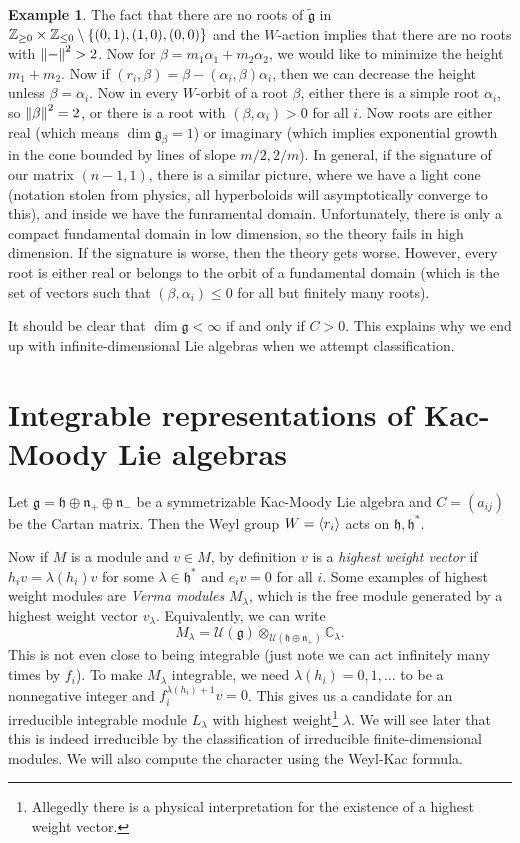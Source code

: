 \documentclass[leqno, openany]{memoir}
\theoremstyle{definition}
\newtheorem{exm}[thm]{Example}
\theoremstyle{remark}
\theoremstyle{plain}
\theoremstyle{definition}
\theoremstyle{remark}
\newcommand{\C}{\mathbb{C}}
\newcommand{\Z}{\mathbb{Z}}
\newcommand{\mc}[1]{\mathcal{#1}}
\newcommand{\mf}[1]{\mathfrak{#1}}
\newcommand{\wtl}[1]{\widetilde{#1}}
\begin{document}
\begin{exm}
    The fact that there are no roots of $\wtl{\mf{g}}$ in $\Z_{\geq 0} \times \Z_{\leq 0} \setminus \qty{(0,1), (1,0), (0,0)}$ and the $W$-action implies that there are no roots with $\norm{-}^2 > 2$. Now for $\beta = m_1 \alpha_1 + m_2 \alpha_2$, we would like to minimize the height $m_1 + m_2$. Now if $(r_i, \beta) = \beta - (\alpha_i, \beta) \alpha_i$, then we can decrease the height unless $\beta = \alpha_i$. Now in every $W$-orbit of a root $\beta$, either there is a simple root $\alpha_i$, so $\norm{\beta}^2 = 2$, or there is a root with $(\beta, \alpha_i) > 0$ for all $i$. Now roots are either real (which means $\dim \mf{g}_{\beta} = 1$) or imaginary (which implies exponential growth in the cone bounded by lines of slope $m/2, 2/m$). In general, if the signature of our matrix $(n-1,1)$, there is a similar picture, where we have a light cone (notation stolen from physics, all hyperboloids will asymptotically converge to this), and inside we have the funramental domain. Unfortunately, there is only a compact fundamental domain in low dimension, so the theory fails in high dimension. If the signature is worse, then the theory gets worse. However, every root is either real or belongs to the orbit of a fundamental domain (which is the set of vectors such that $(\beta, \alpha_i) \leq 0$ for all but finitely many roots).
\end{exm}

It should be clear that $\dim \mf{g} < \infty$ if and only if $C > 0$. This explains why we end up with infinite-dimensional Lie algebras when we attempt classification.

\section{Integrable representations of Kac-Moody Lie algebras}%
\label{sec:integrable_representations_of_kac_moody_lie_algebras}

Let $\mf{g} = \mf{h} \oplus \mf{n}_+ \oplus \mf{n}_-$ be a symmetrizable Kac-Moody Lie algebra and $C = (a_{ij})$ be the Cartan matrix. Then the Weyl group $W = \ev{r_i}$ acts on $\mf{h}, \mf{h}^*$.

Now if $M$ is a module and $v \in M$, by definition $v$ is a \textit{highest weight vector} if $h_i v = \lambda(h_i) v$ for some $\lambda \in \mf{h}^*$ and $e_i v = 0$ for all $i$. Some examples of highest weight modules are \textit{Verma modules} $M_{\lambda}$, which is the free module generated by a highest weight vector $v_{\lambda}$. Equivalently, we can write
\[ M_{\lambda} = \mc{U}(\mf{g}) \otimes_{\mc{U}(\mf{h} \oplus \mf{n}_+)} \C_{\lambda}. \]
This is not even close to being integrable (just note we can act infinitely many times by $f_i$). To make $M_{\lambda}$ integrable, we need $\lambda(h_i) = 0,1,\ldots$ to be a nonnegative integer and $f_i^{\lambda(h_i)+1} v = 0$. This gives us a candidate for an irreducible integrable module $L_{\lambda}$ with highest weight\footnote{Allegedly there is a physical interpretation for the existence of a highest weight vector.} $\lambda$. We will see later that this is indeed irreducible by the classification of irreducible finite-dimensional modules. We will also compute the character using the Weyl-Kac formula.
\end{document}

